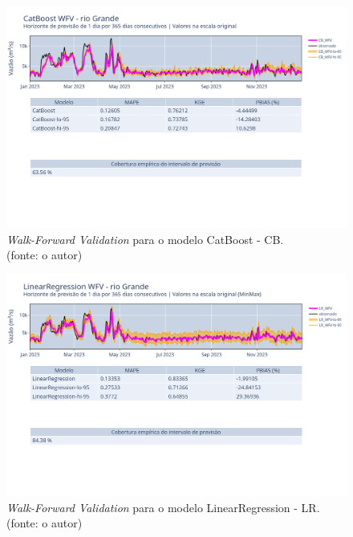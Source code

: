 \begin{figure}[!h]
\centering
\includegraphics[scale=0.33]{Figuras/rio_grande/wfv/CB/CB_WFV_ORIG.png}
\caption{\textit{Walk-Forward Validation} para o modelo CatBoost - CB.\\(fonte: o autor)}
\label{fig:grande_CB_WFV_ORIG}
\end{figure}

\begin{figure}[!h]
\centering
\includegraphics[scale=0.33]{Figuras/rio_grande/wfv/LR/LR_WFV_ORIG.png}
\caption{\textit{Walk-Forward Validation} para o modelo LinearRegression - LR.\\(fonte: o autor)}
\label{fig:grande_LR_WFV_ORIG}
\end{figure}

